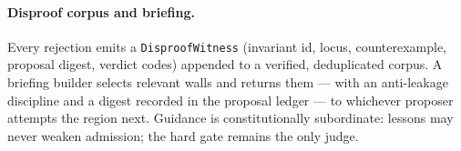 \documentclass[11pt]{article}
\begin{document}
\paragraph{Disproof corpus and briefing.} Every rejection emits a
\texttt{DisproofWitness} (invariant id, locus, counterexample, proposal digest,
verdict codes) appended to a verified, deduplicated corpus. A briefing builder
selects relevant walls and returns them --- with an anti-leakage discipline and a
digest recorded in the proposal ledger --- to whichever proposer attempts the
region next. Guidance is constitutionally subordinate: lessons may never weaken
admission; the hard gate remains the only judge.


\end{document}
